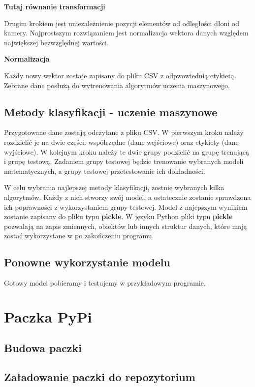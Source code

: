 \quad \textbf{Tutaj równanie transformacji}

\quad Drugim krokiem jest uniezależnienie pozycji elementów od odległości dłoni od kamery. Najprostszym rozwiązaniem jest normalizacja wektora danych względem największej bezwzględnej wartości. 

\quad \textbf{Normalizacja}

\quad Każdy nowy wektor zostaje zapisany do pliku CSV z odpwowiednią etykietą. Zebrane dane posłużą do wytrenowania algorytmów uczenia maszynowego. 



\subsection{Metody klasyfikacji - uczenie maszynowe}

\quad Przygotowane dane zostają odczytane z pliku CSV. W pierwszym kroku należy rozdzielić je na dwie części: współrzędne (dane wejściowe) oraz etykiety (dane wyjściowe). W kolejnym kroku należy te dwie grupy podzielić na grupę trenującą i grupę testową. Zadaniem grupy testowej będzie trenowanie wybranych modeli matematycznych, a grupy testowej przetestowanie ich dokładności. 

\quad W celu wybrania najlepszej metody klasyfikacji, zostnie wybranych kilka algorytmów. Każdy z nich stworzy swój model, a ostatecznie zostanie sprawdzona ich poprawności z wykorzystaniem grupy testowej. Model z najepszym wynikiem zostanie zapisany do pliku typu \textbf{pickle}. W języku Python pliki typu \textbf{pickle} pozwalają na zapis zmiennych, obiektów lub innych struktur danych, które mają zostać wykorzystane w po zakończeniu programu. 

\subsection{Ponowne wykorzystanie modelu}

\quad Gotowy model pobieramy i testujemy w przykładowym programie. 

\section{Paczka PyPi}
\subsection{Budowa paczki}
\subsection{Załadowanie paczki do repozytorium}
